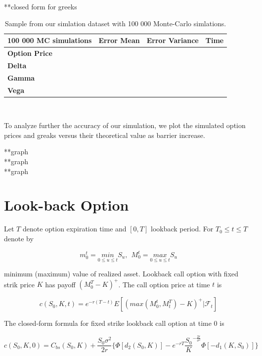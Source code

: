 \documentclass[12pt,a4paper,fleqn]{article}
\begin{document}
**closed form for greeks
\\


\begin{table}
  \centering
\label{bo:values}
\begin{tabular}{|l|c|c|c|}
\hline
100 000 MC simulations      & \textbf{Error Mean} & \textbf{Error Variance} & \textbf{Time} \\ \hline
\textbf{Option Price} & &                   &               \\ \hline
\textbf{Delta}        & &                   &               \\ \hline
\textbf{Gamma}        & &                &                   \\ \hline
\textbf{Vega}         & &                &                   \\ \hline
\end{tabular}\\

\caption{Sample from our simlation dataset with 100 000 Monte-Carlo simlations.}

\end{table}


To analyze further the accuracy of our simulation, we plot the simulated option prices and greaks versus their theoretical value as barrier increase.

**graph\\
**graph\\
**graph\\


\section{Look-back Option}

Let $T$ denote option expiration time and $[0,T]$ lookback period. For $T_0 \leq t\leq T$ denote by

$$m^t_{0} =\underset{0 \leq u \leq t}{min}  S_u, \ \   M^t_{0} = \underset{0 \leq u \leq t}{max} S_u$$

minimum (maximum) value of realized asset. Lookback call option with fixed strik price $K$ has payoff $(M^T_{0}-K)^+$. The call option price at time $t$ is

$$c(S_0,K,t) = e^{-r(T-t)}E[(max(M^t_0,M^T_t)-K)^+|\mathcal{F}_t] $$

The closed-form formula for fixed strike lookback call option at time 0 is

$$c(S_0,K,0)=C_{bs}(S_0,K) + \frac{S_0\sigma^2}{2r}\{ \Phi[d_2(S_0,K)]-e^{-rT}\frac{S_0}{K}^{-\frac{2r}{\sigma^2}} \Phi[-d_1(K,S_0)]\}$$
\end{document}
